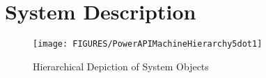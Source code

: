 \section{System Description}\label{sec:PowerAPIBaseSysDesc}

\begin{figure}
	\begin{center}
		\texttt{[image: FIGURES/PowerAPIMachineHierarchy5dot1]}
	\end{center}
	\caption{Hierarchical Depiction of System Objects}
	\label{fig:BaseSystemMap}
\end{figure}

